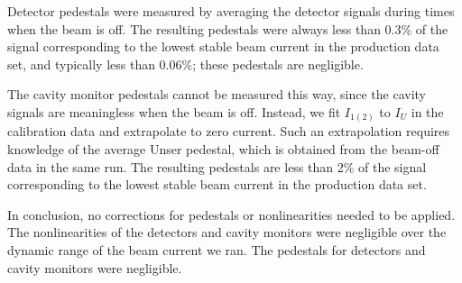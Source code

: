 Detector pedestals were measured by averaging the detector
signals during times when the beam is off.  The resulting pedestals
were always less than 0.3\% of the signal corresponding to the lowest
stable beam current in the production data set, and typically less
than 0.06\%; these pedestals are negligible.

The cavity monitor pedestals cannot be measured this way, since the
cavity signals are meaningless when the beam is off.  Instead, we fit
$I_{1(2)}$ to $I_U$ in the calibration data and extrapolate to zero
current.  Such an extrapolation requires knowledge of the average
Unser pedestal, which is obtained from the beam-off data in the same
run.  The resulting pedestals are less than 2\% of the signal
corresponding to the lowest stable beam current in the production data
set.

In conclusion, no corrections for pedestals or nonlinearities needed 
to be applied.  The nonlinearities of the detectors and cavity monitors
were negligible over the dynamic range of the beam current we ran.
The pedestals for detectors and cavity monitors were negligible.
